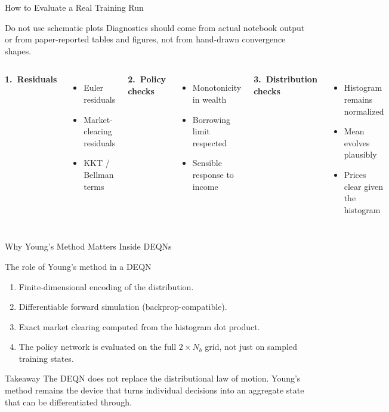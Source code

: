 \documentclass[aspectratio=169,11pt]{beamer}
\newcommand{\emphc}[1]{\textcolor{harvardcrimson}{#1}}
\begin{document}
\begin{frame}{How to Evaluate a Real Training Run}
\small
\begin{block}{Do not use schematic plots}
Diagnostics should come from \emphc{actual notebook output} or from \emphc{paper-reported tables and figures}, not from hand-drawn convergence shapes.
\end{block}

\vspace{0.3em}
\begin{columns}[T]
\textbf{1.\ Residuals}
\begin{itemize}\itemsep2pt
    \item Euler residuals
    \item Market-clearing residuals
    \item KKT / Bellman terms
\end{itemize}

\textbf{2.\ Policy checks}
\begin{itemize}\itemsep2pt
    \item Monotonicity in wealth
    \item Borrowing limit respected
    \item Sensible response to income
\end{itemize}

\textbf{3.\ Distribution checks}
\begin{itemize}\itemsep2pt
    \item Histogram remains normalized
    \item Mean evolves plausibly
    \item Prices clear given the histogram
\end{itemize}
\end{columns}
\end{frame}

\begin{frame}{Why Young's Method Matters Inside DEQNs}
\small
\begin{block}{The role of Young's method in a DEQN}
\begin{enumerate}\itemsep1pt
    \item \emphc{Finite-dimensional encoding} of the distribution.
    \item \emphc{Differentiable} forward simulation (backprop-compatible).
    \item \emphc{Exact market clearing} computed from the histogram dot product.
    \item The policy network is evaluated on the \emphc{full $2\!\times\!N_b$ grid}, not just on sampled training states.
\end{enumerate}
\end{block}

\vspace{0.3em}
\begin{alertblock}{Takeaway}
The DEQN does not replace the distributional law of motion.  Young's method remains the device that turns individual decisions into an aggregate state that can be differentiated through.
\end{alertblock}
\end{frame}
\end{document}
